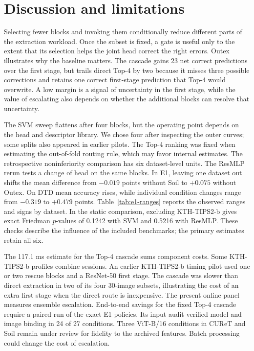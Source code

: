 \documentclass[10pt,a4paper,fleqn]{article}
\begin{document}
\section{Discussion and limitations}

Selecting fewer blocks and invoking them conditionally reduce different parts of the extraction workload. Once the subset is fixed, a gate is useful only to the extent that its selection helps the joint head correct the right errors. Outex illustrates why the baseline matters. The cascade gains 23 net correct predictions over the first stage, but trails direct Top-4 by two because it misses three possible corrections and retains one correct first-stage prediction that Top-4 would overwrite. A low margin is a signal of uncertainty in the first stage, while the value of escalating also depends on whether the additional blocks can resolve that uncertainty.

The SVM sweep flattens after four blocks, but the operating point depends on the head and descriptor library. We chose four after inspecting the outer curves; some splits also appeared in earlier pilots. The Top-4 ranking was fixed when estimating the out-of-fold routing rule, which may favor internal estimates. The retrospective noninferiority comparison has six dataset-level units. The ResMLP rerun tests a change of head on the same blocks. In E1, leaving one dataset out shifts the mean difference from $-0.019$ points without Soil to $+0.075$ without Outex. On DTD mean accuracy rises, while individual condition changes range from $-0.319$ to $+0.479$ points. Table~\ref{tab:e1-ranges} reports the observed ranges and signs by dataset. In the static comparison, excluding KTH-TIPS2-b gives exact Friedman $p$-values of 0.1242 with SVM and 0.5216 with ResMLP. These checks describe the influence of the included benchmarks; the primary estimates retain all six.

The 117.1 ms estimate for the Top-4 cascade sums component costs. Some KTH-TIPS2-b profiles combine sessions. An earlier KTH-TIPS2-b timing pilot used one or two rescue blocks and a ResNet-50 first stage. The cascade was slower than direct extraction in two of its four 30-image subsets, illustrating the cost of an extra first stage when the direct route is inexpensive. The present online panel measures ensemble escalation. End-to-end savings for the fixed Top-4 cascade require a paired run of the exact E1 policies. Its input audit verified model and image binding in 24 of 27 conditions. Three ViT-B/16 conditions in CUReT and Soil remain under review for fidelity to the archived features. Batch processing could change the cost of escalation.
\end{document}
